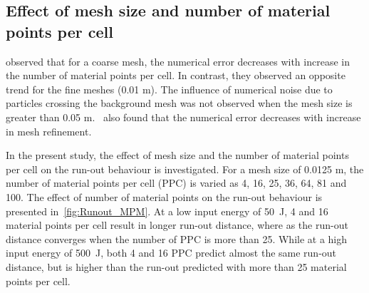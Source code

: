 \subsection{Effect of mesh size and number of material points per cell}
\label{sec:MPM_points_per_cell}

\citet{Abe2013} observed that for a coarse mesh, the numerical error 
decreases with increase in the number of material points per cell. In contrast, 
they observed an opposite trend for the fine meshes (0.01 \si{\m}). The 
influence of numerical noise due to particles crossing the background mesh was 
not observed when the mesh size is greater than 0.05 
\si{\m}.~\citet{Coetzee2005} also found that the numerical error decreases with 
increase in mesh refinement.

In the present study, the effect of mesh size and the number of material points 
per cell on the run-out behaviour is investigated. For a mesh size of 0.0125 
\si{\m}, the number of material points per cell (PPC) is varied as 4, 16, 25, 
36, 64, 81 and 100. The effect of number of material points on the run-out 
behaviour is presented in~\cref{fig:Runout_MPM}. At a low input energy of 
50~\si{\J}, 4 and 16 material points per cell result in longer run-out 
distance, where as the 
run-out distance converges when the number of PPC is more 
than 25. While at a high input energy of 500~\si{J}, both 4 and 16 PPC predict 
almost the same run-out distance, but is higher than the run-out predicted 
with more than 25 material points per cell. 

